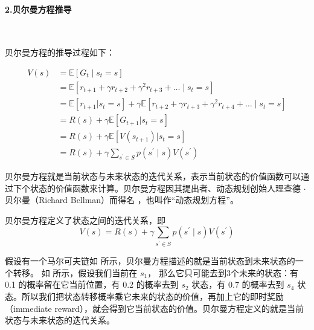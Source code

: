 \paragraph{2.贝尔曼方程推导}~{}
\newline

贝尔曼方程的推导过程如下：

\begin{equation}
  \label{}
  \begin{aligned}
    V(s)&=\mathbb{E}\left[G_{t} \mid s_{t}=s\right]\\
    &=\mathbb{E}\left[r_{t+1}+\gamma r_{t+2}+\gamma^{2} r_{t+3}+\ldots \mid s_{t}=s\right]  \\
    &=\mathbb{E}\left[r_{t+1}|s_t=s\right] +\gamma \mathbb{E}\left[r_{t+2}+\gamma r_{t+3}+\gamma^{2} r_{t+4}+\ldots \mid s_{t}=s\right]\\
    &=R(s)+\gamma \mathbb{E}[G_{t+1}|s_t=s] \\
    &=R(s)+\gamma \mathbb{E}[V(s_{t+1})|s_t=s]\\
    &=R(s)+\gamma \sum_{s^{\prime} \in S} p\left(s^{\prime} \mid s\right) V\left(s^{\prime}\right)
    \end{aligned}  
\end{equation}


\begin{tcolorbox}[colframe=blue!25,colback=blue!10]
 贝尔曼方程就是当前状态与未来状态的迭代关系，表示当前状态的价值函数可以通过下个状态的价值函数来计算。贝尔曼方程因其提出者、动态规划创始人理查德 $\cdot$ 贝尔曼（Richard Bellman）而得名 ，也叫作“动态规划方程”。
\end{tcolorbox}


贝尔曼方程定义了状态之间的迭代关系，即
\begin{equation}
  V(s)=R(s)+\gamma \sum_{s^{\prime} \in S} p\left(s^{\prime} \mid s\right) V\left(s^{\prime}\right)
  \label{eq:}
\end{equation}

假设有一个马尔可夫链如 所示，贝尔曼方程描述的就是当前状态到未来状态的一个转移。
如 所示，假设我们当前在 $s_1$， 那么它只可能去到3个未来的状态：有 0.1 的概率留在它当前位置，有 0.2 的概率去到 $s_2$ 状态，有 0.7 的概率去到 $s_4$ 状态。所以我们把状态转移概率乘它未来的状态的价值，再加上它的即时奖励（immediate reward），就会得到它当前状态的价值。贝尔曼方程定义的就是当前状态与未来状态的迭代关系。

